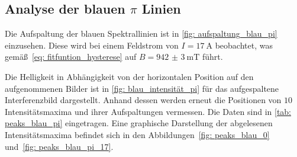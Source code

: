 \subsection{Analyse der blauen $\pi$ Linien}
Die Aufspaltung der blauen Spektrallinien ist in \autoref{fig: aufspaltung_blau_pi} einzusehen. Diese wird bei einem
Feldstrom von $I = \SI{17}{\ampere}$ beobachtet, was gemäß~\eqref{eq: fitfuntion_hysterese} auf $B = \SI{942(3)}{\milli\tesla}$ führt.

Die Helligkeit in Abhängigkeit von der horizontalen Position auf den aufgenommenen Bilder ist in \autoref{fig: blau_intensität_pi} für das aufgespaltene Interferenzbild dargestellt.
Anhand dessen werden erneut die Positionen von $10$ Intensitätsmaxima und ihrer Aufspaltungen
vermessen. Die Daten sind in \autoref{tab: peaks_blau_pi} eingetragen. Eine graphische Darstellung
der abgelesenen Intensitätsmaxima befindet sich in den Abbildungen~\ref{fig: peaks_blau_0} und~\ref{fig: peaks_blau_pi_17}.

